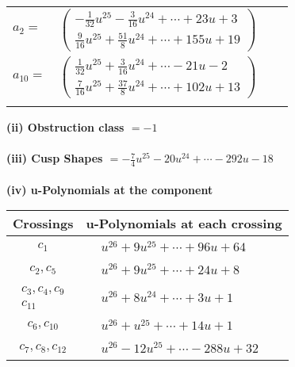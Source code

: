 \documentclass[1p]{elsarticle_modified}
\theoremstyle{definition}
\begin{document}
\begin{tabular}{m{7pt} m{180pt} m{7pt} m{180pt} }
\flushright $a_{2}=$&$\begin{pmatrix}-\frac{1}{32} u^{25}-\frac{3}{16} u^{24}+\cdots+23 u+3\\\frac{9}{16} u^{25}+\frac{51}{8} u^{24}+\cdots+155 u+19\end{pmatrix}$ \\
\flushright $a_{10}=$&$\begin{pmatrix}\frac{1}{32} u^{25}+\frac{3}{16} u^{24}+\cdots-21 u-2\\\frac{7}{16} u^{25}+\frac{37}{8} u^{24}+\cdots+102 u+13\end{pmatrix}$\\&\end{tabular}
\flushleft \textbf{(ii) Obstruction class $= -1$}\\~\\
\flushleft \textbf{(iii) Cusp Shapes $= -\frac{7}{4} u^{25}-20 u^{24}+\cdots-292 u-18$}\\~\\
\newpage\renewcommand{\arraystretch}{1}
\flushleft \textbf{(iv) u-Polynomials at the component}\newline \\
\begin{tabular}{m{50pt}|m{274pt}}
Crossings & \hspace{64pt}u-Polynomials at each crossing \\
\hline $$\begin{aligned}c_{1}\end{aligned}$$&$\begin{aligned}
&u^{26}+9 u^{25}+\cdots+96 u+64
\end{aligned}$\\
\hline $$\begin{aligned}c_{2},c_{5}\end{aligned}$$&$\begin{aligned}
&u^{26}+9 u^{25}+\cdots+24 u+8
\end{aligned}$\\
\hline $$\begin{aligned}c_{3},c_{4},c_{9}\\c_{11}\end{aligned}$$&$\begin{aligned}
&u^{26}+8 u^{24}+\cdots+3 u+1
\end{aligned}$\\
\hline $$\begin{aligned}c_{6},c_{10}\end{aligned}$$&$\begin{aligned}
&u^{26}+u^{25}+\cdots+14 u+1
\end{aligned}$\\
\hline $$\begin{aligned}c_{7},c_{8},c_{12}\end{aligned}$$&$\begin{aligned}
&u^{26}-12 u^{25}+\cdots-288 u+32
\end{aligned}$\\
\hline
\end{tabular}\\~\\
\end{document}
